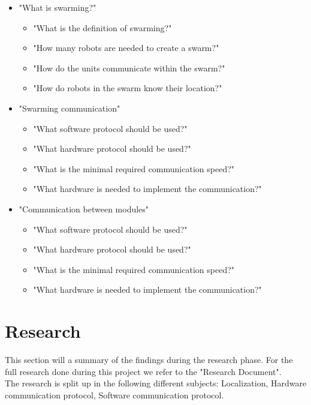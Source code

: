 \documentclass[10pt,a4paper]{article}
\begin{document}
\begin{itemize}

    \item "What is swarming?"
    \begin{itemize}
        \item "What is the definition of swarming?"
        \item "How many robots are needed to create a swarm?"
        \item "How do the units communicate within the swarm?"
        \item "How do robots in the swarm know their location?"
    \end{itemize}    
    \item "Swarming communication"
    \begin{itemize}
        \item "What software protocol should be used?"
        \item "What hardware protocol should be used?"
        \item "What is the minimal required communication speed?"
        \item "What hardware is needed to implement the communication?"
    \end{itemize}
     \item "Communication between modules"
    \begin{itemize}
        \item "What software protocol should be used?"
        \item "What hardware protocol should be used?"
        \item "What is the minimal required communication speed?"
        \item "What hardware is needed to implement the communication?"
    \end{itemize}
 \end{itemize}

\newpage


\section{Research}
This section will a summary of the findings during the research phase. For the full research done during this project we refer to the "Research Document". \\
The research is split up in the following different subjects: Localization, Hardware communication protocol, Software communication protocol.
\end{document}

